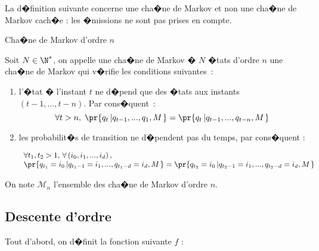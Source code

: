 La d�finition suivante concerne une cha�ne de Markov et non une cha�ne de Markov cach�e : les �missions ne sont pas prises en compte.

        \begin{xdefinition}{Cha�ne de Markov d'ordre $n$}
        \label{definition_mmc_ordre_n}
        
        Soit $N\in\N^{\ast}$, on appelle une cha�ne de Markov � $N$ �tats d'ordre $n$ une cha�ne de Markov 
        qui v�rifie les conditions suivantes~:
        
                \begin{enumerate}
                \item l'�tat � l'instant $t$ ne d�pend que des �tats aux instants $\left(  t-1,...,t-n\right)$. 
                            Par cons�quent~:
                    $$
                    \forall t>n, \; \pr{  q_{t}\left|  q_{t-1},...,q_{1},M\right. }  = \pr{   q_{t}\left| 
                     q_{t-1},...,q_{t-n},M\right. }
                    $$
                    
                \item les probabilit�s de transition ne d�pendent pas du temps, par cons�quent :
                
                    $$
                    \begin{array}{l} \forall t_{1},t_{2}>1,\,\forall\left(i_{0},i_{1},...,i_{d}\right),\\
                    \pr{  q_{t_{1}}=i_{0}\left|q_{t_{1}-1}=i_{1},...,
                    q_{t_{1}-d}=i_{d},M\right.  }  = \pr{  q_{t_{2}}=i_{0}\left|  
                            q_{t_{2}-1}=i_{1},...,q_{t_{2}-d}=i_{d},M\right.  }
                    \end{array}
                    $$
                    
                \end{enumerate}
        \end{xdefinition}
        

On note $\mathcal{M}_{n}$ l'ensemble des cha�ne de Markov d'ordre $n$.




\subsection{Descente d'ordre}
%

Tout d'abord, on d�finit la fonction suivante $f$ :

